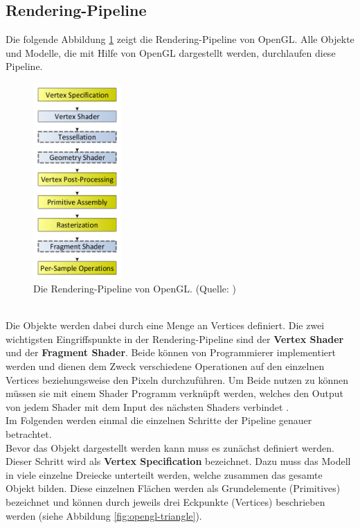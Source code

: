 \subsection{Rendering-Pipeline} Die folgende Abbildung \ref{fig:rendering-pipeline} zeigt die Rendering-Pipeline von OpenGL. Alle Objekte und Modelle, die mit Hilfe von OpenGL dargestellt werden, durchlaufen diese Pipeline. 
\begin{figure}[h!]
\centering
\includegraphics[width=0.3\textwidth]{Abbildungen/rendering-pipeline-opengl.png}
\caption[OpenGL Rendering Pipline]{Die Rendering-Pipeline von OpenGL. (Quelle: \citet{khronos:rendering-pipeline})}
\label{fig:rendering-pipeline}
\end{figure}\\
Die Objekte werden dabei durch eine Menge an Vertices definiert. Die zwei wichtigsten Eingriffspunkte in der Rendering-Pipeline sind der \textbf{Vertex Shader} und der \textbf{Fragment Shader}. Beide können von Programmierer implementiert werden und dienen dem Zweck verschiedene Operationen auf den einzelnen Vertices beziehungsweise den Pixeln durchzuführen. Um Beide nutzen zu können müssen sie mit einem Shader Programm verknüpft werden, welches den Output von jedem Shader mit dem Input des nächsten Shaders verbindet \citep{vries:learn-opengl-triangle}.\\
Im Folgenden werden einmal die einzelnen Schritte der Pipeline genauer betrachtet.\\
Bevor das Objekt dargestellt werden kann muss es zunächst definiert werden. Dieser Schritt wird als \textbf{Vertex Specification} bezeichnet. Dazu muss das Modell in viele einzelne Dreiecke unterteilt werden, welche zusammen das gesamte Objekt bilden. Diese einzelnen Flächen werden als Grundelemente (Primitives) bezeichnet \citep{khronos:rendering-pipeline} und können durch jeweils drei Eckpunkte (Vertices) beschrieben werden (siehe Abbildung \ref{fig:opengl-triangle}).

